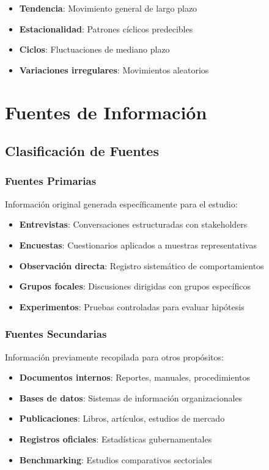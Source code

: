 \documentclass[12pt,letterpaper,oneside]{book}
\begin{document}
\begin{itemize}
\item \textbf{Tendencia}: Movimiento general de largo plazo
\item \textbf{Estacionalidad}: Patrones cíclicos predecibles
\item \textbf{Ciclos}: Fluctuaciones de mediano plazo
\item \textbf{Variaciones irregulares}: Movimientos aleatorios
\end{itemize}

\section{Fuentes de Información}

\subsection{Clasificación de Fuentes}

\subsubsection{Fuentes Primarias}

Información original generada específicamente para el estudio:

\begin{itemize}
\item \textbf{Entrevistas}: Conversaciones estructuradas con stakeholders
\item \textbf{Encuestas}: Cuestionarios aplicados a muestras representativas
\item \textbf{Observación directa}: Registro sistemático de comportamientos
\item \textbf{Grupos focales}: Discusiones dirigidas con grupos específicos
\item \textbf{Experimentos}: Pruebas controladas para evaluar hipótesis
\end{itemize}

\subsubsection{Fuentes Secundarias}

Información previamente recopilada para otros propósitos:

\begin{itemize}
\item \textbf{Documentos internos}: Reportes, manuales, procedimientos
\item \textbf{Bases de datos}: Sistemas de información organizacionales
\item \textbf{Publicaciones}: Libros, artículos, estudios de mercado
\item \textbf{Registros oficiales}: Estadísticas gubernamentales
\item \textbf{Benchmarking}: Estudios comparativos sectoriales
\end{itemize}
\end{document}
